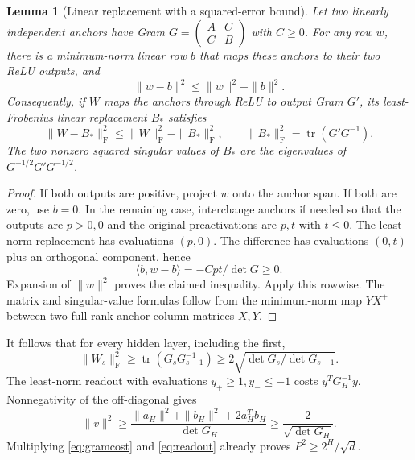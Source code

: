\documentclass[11pt]{article}
\newtheorem{lemma}[theorem]{Lemma}
\theoremstyle{remark}\newtheorem{remark}[theorem]{Remark}
\newcommand{\F}{\mathrm F}
\newcommand{\tr}{\operatorname{tr}}
\begin{document}
\begin{lemma}[Linear replacement with a squared-error bound]\label{lem:replacement}
Let two linearly independent anchors have Gram
$G=\left(\begin{smallmatrix}A&C\\C&B\end{smallmatrix}\right)$ with $C\ge0$.
For any row $w$, there is a minimum-norm linear row $b$ that maps these
anchors to their two ReLU outputs, and
\[
 \|w-b\|^2\le\|w\|^2-\|b\|^2.
\]
Consequently, if $W$ maps the anchors through ReLU to output Gram $G'$, its
least-Frobenius linear replacement $B_*$ satisfies
\[
 \|W-B_*\|_\F^2\le\|W\|_\F^2-\|B_*\|_\F^2,
 \qquad \|B_*\|_\F^2=\tr(G'G^{-1}).
\]
The two nonzero squared singular values of $B_*$ are the eigenvalues of
$G^{-1/2}G'G^{-1/2}$.
\end{lemma}
\begin{proof}
If both outputs are positive, project $w$ onto the anchor span.  If both
are zero, use $b=0$.  In the remaining case, interchange anchors if needed
so that the outputs are $p>0,0$ and the original preactivations are $p,t$
with $t\le0$.  The least-norm replacement has evaluations $(p,0)$.
The difference has evaluations $(0,t)$ plus an orthogonal component, hence
\[
 \langle b,w-b\rangle=-Cpt/\det G\ge0.
\]
Expansion of $\|w\|^2$ proves the claimed inequality.  Apply this rowwise.
The matrix and singular-value formulas follow from the minimum-norm map
$Y X^+$ between two full-rank anchor-column matrices $X,Y$.
\end{proof}

It follows that for every hidden layer, including the first,
\begin{equation}\label{eq:gramcost}
 \|W_s\|_\F^2\ge\tr(G_sG_{s-1}^{-1})
                \ge2\sqrt{\det G_s/\det G_{s-1}}.
\end{equation}
The least-norm readout with evaluations $y_+\ge1,y_-\le-1$ costs
$y^TG_H^{-1}y$.  Nonnegativity of the off-diagonal gives
\begin{equation}\label{eq:readout}
 \|v\|^2\ge\frac{\|a_H\|^2+\|b_H\|^2+2a_H^Tb_H}{\det G_H}
             \ge\frac2{\sqrt{\det G_H}}.
\end{equation}
Multiplying \eqref{eq:gramcost} and \eqref{eq:readout} already proves
$P^2\ge2^H/\sqrt d$.
\end{document}
